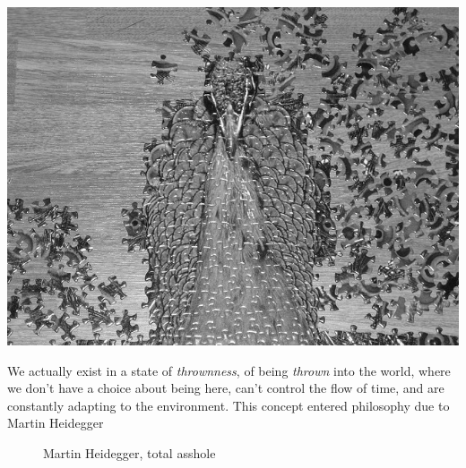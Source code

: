 \documentclass[statementpaper,oneside,article,14pt]{memoir}
\begin{document}
\includegraphics[width=0.7\paperwidth,height=0.7\paperheight,keepaspectratio]{PeacockPuzzleBW.jpg}

We actually exist in a state of \textit{thrownness}, of being \textit{thrown} into the world, where we don't have a choice about being here, can't control the flow of time, and are constantly adapting to the environment.
\newpage
This concept entered philosophy due to Martin Heidegger
  \begin{figure}[!htb]
        \caption{Martin Heidegger, total asshole}
\end{figure}
    
\end{document}
